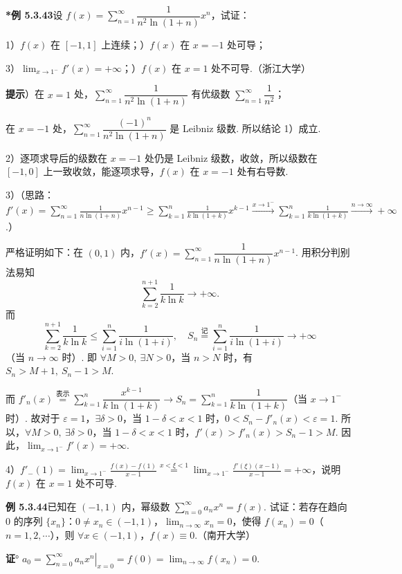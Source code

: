\documentclass[UTF8, 12pt, fontset=fandol, oneside]{ctexart}
\begin{document}
\noindent\textbf{*例 5.3.43}\quad 设 $f(x)=\displaystyle\sum_{n=1}^{\infty}\dfrac1{n^2\ln(1+n)}x^n$，试证：

1）$f(x)$ 在 $[-1,1]$ 上连续；）$f(x)$ 在 $x=-1$ 处可导；

3）$\displaystyle\lim_{x\to1^-}f'(x)=+\infty$；）$f(x)$ 在 $x=1$ 处不可导.（浙江大学）

\noindent\textbf{提示}）在 $x=1$ 处，$\displaystyle\sum_{n=1}^{\infty}\dfrac1{n^2\ln(1+n)}$ 有优级数 $\displaystyle\sum_{n=1}^{\infty}\dfrac1{n^2}$；

在 $x=-1$ 处，$\displaystyle\sum_{n=1}^{\infty}\dfrac{(-1)^n}{n^2\ln(1+n)}$ 是 Leibniz 级数. 所以结论 1）成立.

2）逐项求导后的级数在 $x=-1$ 处仍是 Leibniz 级数，收敛，所以级数在 $[-1,0]$ 上一致收敛，能逐项求导，$f(x)$ 在 $x=-1$ 处有右导数.

3）（思路：$\displaystyle f'(x)=\sum_{n=1}^{\infty}\frac1{n\ln(1+n)}x^{n-1}\ge
\sum_{k=1}^n\frac1{k\ln(1+k)}x^{k-1}\xrightarrow{x\to1^-}
\sum_{k=1}^n\frac1{k\ln(1+k)}\xrightarrow{n\to\infty}+\infty$.）

严格证明如下：在 $(0,1)$ 内，$f'(x)=\displaystyle\sum_{n=1}^{\infty}\dfrac1{n\ln(1+n)}x^{n-1}$. 用积分判别法易知
\[
  \sum_{k=2}^{n+1}\frac1{k\ln k}\to+\infty.
\]
而
\[
  \sum_{k=2}^{n+1}\frac1{k\ln k}
  \le\sum_{i=1}^n\frac1{i\ln(1+i)},\quad
  S_n\overset{\text{记}}{=}\sum_{i=1}^n\frac1{i\ln(1+i)}\to+\infty
\]
（当 $n\to\infty$ 时）. 即 $\forall M>0,\ \exists N>0$，当 $n>N$ 时，有 $S_n>M+1,\ S_n-1>M$.

而 $f'_n(x)\overset{\text{表示}}{=}\displaystyle\sum_{k=1}^n\dfrac{x^{k-1}}{k\ln(1+k)}\to S_n=\displaystyle\sum_{k=1}^n\dfrac1{k\ln(1+k)}$（当 $x\to1^-$ 时）. 故对于 $\varepsilon=1$，$\exists\delta>0$，当 $1-\delta<x<1$ 时，$0<S_n-f'_n(x)<\varepsilon=1$. 所以，$\forall M>0,\ \exists\delta>0$，当 $1-\delta<x<1$ 时，$f'(x)>f'_n(x)>S_n-1>M$. 因此，$\displaystyle\lim_{x\to1^-}f'(x)=+\infty$.

4）$f'_-(1)=\displaystyle\lim_{x\to1^-}\frac{f(x)-f(1)}{x-1}
\stackrel{x<\xi<1}{=}
\lim_{x\to1^-}\frac{f'(\xi)(x-1)}{x-1}=+\infty$，说明 $f(x)$ 在 $x=1$ 处不可导.

\noindent\textbf{例 5.3.44}\quad 已知在 $(-1,1)$ 内，幂级数 $\displaystyle\sum_{n=0}^{\infty}a_nx^n=f(x)$. 试证：若存在趋向 0 的序列 $\{x_n\}$：$0\ne x_n\in(-1,1)$，$\displaystyle\lim_{n\to\infty}x_n=0$，使得 $f(x_n)=0$（$n=1,2,\cdots$），则 $\forall x\in(-1,1)$，$f(x)\equiv0$.（南开大学）

\noindent\textbf{证}° $a_0=\left.\displaystyle\sum_{n=0}^{\infty}a_nx^n\right|_{x=0}=f(0)=\displaystyle\lim_{n\to\infty}f(x_n)=0$.
\end{document}
